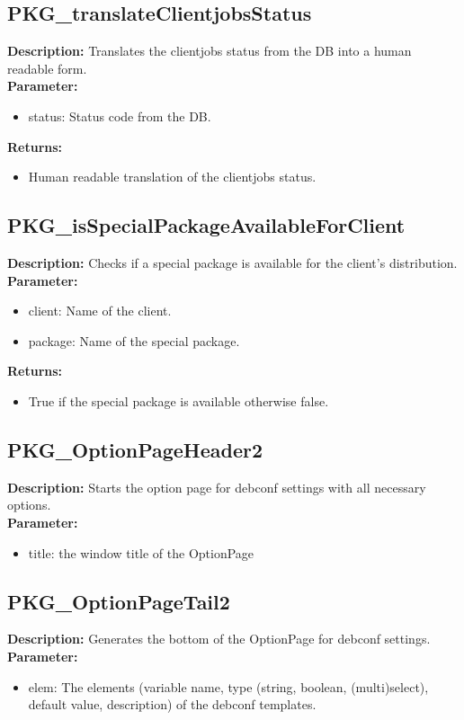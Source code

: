 \subsection{PKG\_translateClientjobsStatus}
\textbf{Description:} Translates the clientjobs status from the DB into a human readable form.\\
\textbf{Parameter:}
\begin{itemize}
\item status: Status code from the DB.
\end{itemize}
\textbf{Returns:}
\begin{itemize}
\item Human readable translation of the clientjobs status.
\end{itemize}

\subsection{PKG\_isSpecialPackageAvailableForClient}
\textbf{Description:} Checks if a special package is available for the client's distribution.\\
\textbf{Parameter:}
\begin{itemize}
\item client: Name of the client.
\item package: Name of the special package.
\end{itemize}
\textbf{Returns:}
\begin{itemize}
\item True if the special package is available otherwise false.
\end{itemize}

\subsection{PKG\_OptionPageHeader2}
\textbf{Description:} Starts the option page for debconf settings with all necessary options.\\
\textbf{Parameter:}
\begin{itemize}
\item title: the window title of the OptionPage
\end{itemize}

\subsection{PKG\_OptionPageTail2}
\textbf{Description:} Generates the bottom of the OptionPage for debconf settings.\\
\textbf{Parameter:}
\begin{itemize}
\item elem: The elements (variable name, type (string, boolean, (multi)select), default value, description) of the debconf templates.
\end{itemize}

